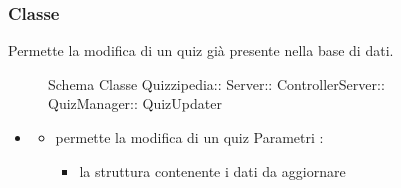 \subsubsection{Classe }
Permette la modifica di un quiz già presente nella base di dati.
\begin{figure}[H]
\centering
\noindent{}
\caption[Schema Classe QuizUpdater]{Schema Classe Quizzipedia:: Server:: ControllerServer:: QuizManager:: QuizUpdater}
\end{figure}
\begin{itemize}
\item {}
\begin{itemize}
\item {}
\newline
permette la modifica di un quiz
\newline
Parametri :
\begin{itemize}
\item {}
\newline
la struttura contenente i dati da aggiornare
\end{itemize}
\end{itemize}
\end{itemize}
